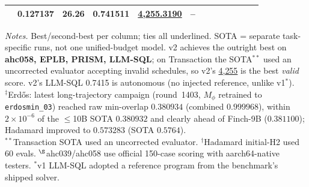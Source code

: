 \begin{table}[t]
{\begin{tabular}{lrrrrrrrrrrrr}
& \textbf{0.127137}
& \textbf{26.26}
& \textbf{0.741511}
& \underline{4,255.3190}
& -- \\
\bottomrule
\end{tabular}%
}
\vspace{2pt}
\begin{flushleft}\footnotesize\textit{Notes.} Best/second-best per column; ties all underlined. SOTA = separate task-specific runs, not one unified-budget model. v2 achieves the outright best on \textbf{ahc058, EPLB, PRISM, LLM-SQL}; on Transaction the SOTA$^{**}$ used an uncorrected evaluator accepting invalid schedules, so v2's \underline{4{,}255} is the best \emph{valid} score. v2's LLM-SQL 0.7415 is autonomous (no injected reference, unlike v1$^\ast$).\\
$^\ddagger$Erd\H{o}s: latest long-trajectory campaign (round~1403, $M_\phi$ retrained to \texttt{erdosmin\_03}) reached raw min-overlap $0.380934$ (combined $0.999968$), within $2\times10^{-6}$ of the $\leq$10B SOTA $0.380932$ and clearly ahead of Finch-9B ($0.381100$); Hadamard improved to $0.573283$ (SOTA $0.5764$).\\
$^{**}$Transaction SOTA used an uncorrected evaluator. $^\dagger$Hadamard initial-H2 used 60 evals. $^\S$ahc039/ahc058 use official 150-case scoring with aarch64-native testers. $^\ast$v1 LLM-SQL adopted a reference program from the benchmark's shipped solver.\end{flushleft}
\end{table}
